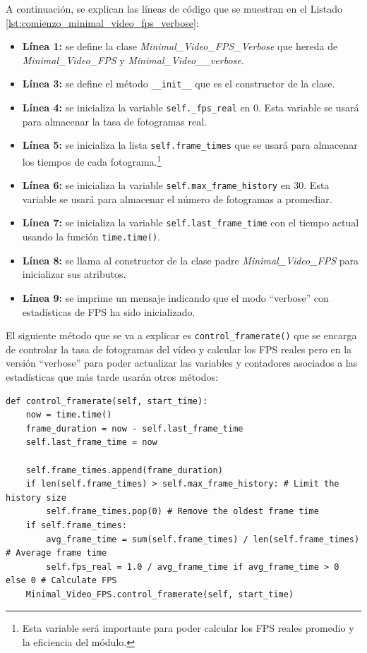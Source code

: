 A continuación, se explican las líneas de código que se muestran en el Listado \ref{lst:comienzo_minimal_video_fps_verbose}:
\begin{itemize}
    \item \textbf{Línea 1:} se define la clase \textit{Minimal\_Video\_FPS\_Verbose} que hereda de \textit{Minimal\_Video\_FPS} y \textit{Minimal\_Video\_\_verbose}.
    \item \textbf{Línea 3:} se define el método \texttt{\_\_init\_\_} que es el constructor de la clase.
    \item \textbf{Línea 4:} se inicializa la variable \texttt{self.\_fps\_real} en 0. Esta variable se usará para almacenar la tasa de fotogramas real.
    \item \textbf{Línea 5:} se inicializa la lista \texttt{self.frame\_times} que se usará para almacenar los tiempos de cada fotograma.\footnote{Esta variable será importante para poder calcular los FPS reales promedio y la eficiencia del módulo.}
    \item \textbf{Línea 6:} se inicializa la variable \texttt{self.max\_frame\_history} en 30. Esta variable se usará para almacenar el número de fotogramas a promediar.
    \item \textbf{Línea 7:} se inicializa la variable \texttt{self.last\_frame\_time} con el tiempo actual usando la función \texttt{time.time()}.
    \item \textbf{Línea 8:} se llama al constructor de la clase padre \textit{Minimal\_Video\_FPS} para inicializar sus atributos.
    \item \textbf{Línea 9:} se imprime un mensaje indicando que el modo ``verbose'' con estadísticas de FPS ha sido inicializado.
\end{itemize}
\vspace{\baselineskip}

El siguiente método que se va a explicar es \texttt{control\_framerate()} que se encarga de controlar la tasa de fotogramas del vídeo y calcular los FPS reales pero en la versión ``verbose'' para poder actualizar las variables y contadores asociados a las estadísticas que más tarde usarán otros métodos:
\begin{lstlisting}[style=pythonstyle, caption={Método \texttt{control\_framerate()} de \textit{Minimal\_Video\_FPS}.}, label={lst:control_framerate_minimal_video_fps_verbose}]
def control_framerate(self, start_time):
    now = time.time()
    frame_duration = now - self.last_frame_time
    self.last_frame_time = now

    self.frame_times.append(frame_duration)
    if len(self.frame_times) > self.max_frame_history: # Limit the history size
        self.frame_times.pop(0) # Remove the oldest frame time
    if self.frame_times:
        avg_frame_time = sum(self.frame_times) / len(self.frame_times) # Average frame time
        self.fps_real = 1.0 / avg_frame_time if avg_frame_time > 0 else 0 # Calculate FPS
    Minimal_Video_FPS.control_framerate(self, start_time)
\end{lstlisting}
\vspace{\baselineskip}

